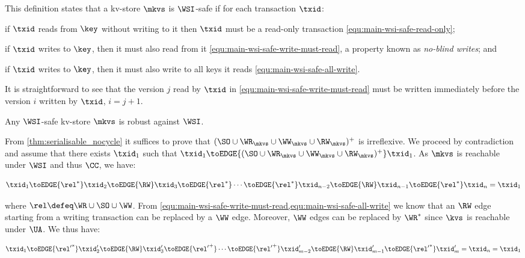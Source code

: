 This definition states that a kv-store $\mkvs$ is \(\WSI\)-safe if for each transaction $\txid$: 
\begin{enumerate*} 
    \item if $\txid$ reads from $\key$ without writing to it then $\txid$ must be a read-only transaction \eqref{equ:main-wsi-safe-read-only}; 
    \item if \( \txid \) writes to $\key$, then it must also read from it \eqref{equ:main-wsi-safe-write-must-read}, a property known as \emph{no-blind writes}; and
	\item if \( \txid \) writes to $\key$, then it must also write to all keys it reads \eqref{equ:main-wsi-safe-all-write}.
\end{enumerate*}
It is straightforward to see that the version $j$ read by \( \txid \) in \eqref{equ:main-wsi-safe-write-must-read} must be written immediately before the version $i$ written by \( \txid \), \ie \( i {=} j + 1 \).

\spaceshrink{-5pt}
\begin{theorem}
 \label{thm:main-wsi-robust}
    Any \(\WSI\)-safe kv-store \( \mkvs \) is robust against \(\WSI\).   
\end{theorem}
\spaceshrink{-5pt}

\noindent From \cref{thm:serialisable_nocycle} it suffices to prove that $(\SO \cup \WR_{\mkvs} \cup \WW_{\mkvs} \cup \RW_{\mkvs})^{+}$ is irreflexive.
We proceed by contradiction and assume that there exists $\txid_1$ such that $\txid_1 \toEDGE{(\SO \cup \WR_{\mkvs} \cup \WW_{\mkvs} \cup \RW_{\mkvs})^{+}} \txid_1$. 
As \( \mkvs \) is reachable under \( \WSI \) and thus \( \CC \), we have:%

\spaceshrink{-5pt}
{\displaymathfont
\[
    \txid_1 \toEDGE{\rel^*} \txid_2 \toEDGE{\RW} \txid_3 \toEDGE{\rel^*} \cdots \toEDGE{\rel^*} \txid_{n-2} \toEDGE{\RW} \txid_{n-1} \toEDGE{\rel^*} \txid_n = \txid_1
\]
\normalsize}%
\spaceshrink{-10pt}
 
\noindent{}where \( \rel \defeq \WR \cup \SO \cup \WW \).
From \ref{equ:main-wsi-safe-write-must-read,equ:main-wsi-safe-all-write} we know that 
an \( \RW \) edge starting from a writing transaction can be replaced by a \( \WW \) edge.
Moreover, \( \WW \) edges can be replaced by \( \WR^* \) since \( \kvs \) is reachable under \( \UA \).
We thus have:

\spaceshrink{-5pt}
{\displaymathfont
\[
    \txid_1 \toEDGE{{\rel'}^*} \txid'_2 \toEDGE{\RW} \txid'_3 \toEDGE{{\rel'}^+} \cdots \toEDGE{{\rel'}^+} \txid'_{m-2} \toEDGE{\RW} \txid'_{m-1} \toEDGE{{\rel'}^*} \txid'_m = \txid_n = \txid_1
\]
\normalsize}
\spaceshrink{-10pt}

